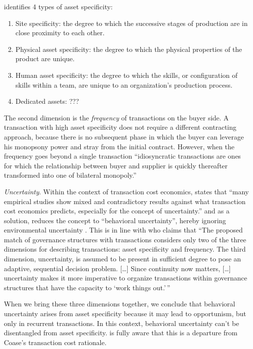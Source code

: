 \documentclass[12pt]{article}
\providecommand{\tightlist}{%
  \setlength{\itemsep}{0pt}\setlength{\parskip}{0pt}}
\begin{document}
\citet[95-96]{williamson1985} identifies 4 types of asset specificity:

\begin{enumerate}
\def\labelenumi{\arabic{enumi}.}
\tightlist
\item
  Site specificity: the degree to which the successive stages of
  production are in close proximity to each other.
\item
  Physical asset specificity: the degree to which the physical
  properties of the product are unique.
\item
  Human asset specificity: the degree to which the skills, or
  configuration of skills within a team, are unique to an organization's
  production process.
\item
  Dedicated assets: ???
\end{enumerate}

The second dimension is the \emph{frequency} of transactions on the
buyer side. A transaction with high asset specificity does not require a
different contracting approach, because there is no subsequent phase in
which the buyer can leverage his monopsony power and stray from the
initial contract. However, when the frequency goes beyond a single
transaction ``idiosyncratic transactions are ones for which the
relationship between buyer and supplier is quickly thereafter
transformed into one of bilateral monopoly.'' \citep[
241]{williamson1985}

\emph{Uncertainty}. Within the context of transaction cost economics,
\citet[38]{shin2003} states that ``many empirical studies show mixed and
contradictory results against what transaction cost economics predicts,
especially for the concept of uncertainty.'' and as a solution, reduces
the concept to ``behavioral uncertainty'', hereby ignoring environmental
uncertainty \citep[ 391-392]{watjatrakul2005}. This is in line with
\citet[79]{williamson1985} who claims that ``The proposed match of
governance structures with transactions considers only two of the three
dimensions for describing transactions: asset specificity and frequency.
The third dimension, uncertainty, is assumed to be present in sufficient
degree to pose an adaptive, sequential decision problem. {[}\ldots{]}
Since continuity now matters, {[}\ldots{]} uncertainty makes it more
imperative to organize transactions within governance structures that
have the capacity to `work things out.'\,''

When we bring these three dimensions together, we conclude that
behavioral uncertainty arises from asset specificity because it may lead
to opportunism, but only in recurrent transactions. In this context,
behavioral uncertainty can't be disentangled from asset specificity.
\citet[78]{williamson1985} is fully aware that this is a departure from
Coase's transaction cost rationale.
\end{document}

